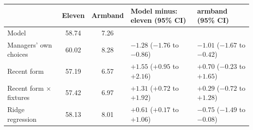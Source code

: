 \begin{tabular}{lccll}
\toprule
 & Eleven & Armband & Model minus: eleven (95\% CI) & armband (95\% CI) \\
\midrule
Model & 58.74 & 7.26 & &  \\
Managers' own choices & 60.02 & 8.28 & $-1.28$ ($-1.76$ to $-0.86$) & $-1.01$ ($-1.67$ to $-0.42$) \\
Recent form & 57.19 & 6.57 & $+1.55$ ($+0.95$ to $+2.16$) & $+0.70$ ($-0.23$ to $+1.65$) \\
Recent form $\times$ fixtures & 57.42 & 6.97 & $+1.31$ ($+0.72$ to $+1.92$) & $+0.29$ ($-0.72$ to $+1.28$) \\
Ridge regression & 58.13 & 8.01 & $+0.61$ ($+0.17$ to $+1.06$) & $-0.75$ ($-1.49$ to $-0.08$) \\
\bottomrule
\end{tabular}
